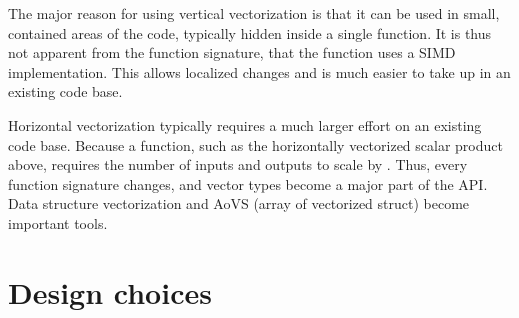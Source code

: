   The major reason for using vertical vectorization is that it can be used in small, contained areas of the code, typically hidden inside a single function.
  It is thus not apparent from the function signature, that the function uses a SIMD implementation.
  This allows localized changes and is much easier to take up in an existing code base.

  Horizontal vectorization typically requires a much larger effort on an existing code base.
  Because a function, such as the horizontally vectorized scalar product above, requires the number of inputs and outputs to scale by .
  Thus, every function signature changes, and vector types become a major part of the API.
  Data structure vectorization and AoVS (array of vectorized struct) become important tools.

\section{Design choices}
